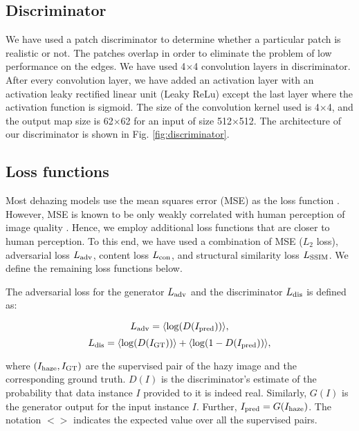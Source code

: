 \documentclass[runningheads]{llncs}
\begin{document}
\subsection{Discriminator} We have used a patch discriminator to determine whether a particular patch is realistic or not. The patches overlap in order to eliminate the problem of low performance on the edges. We have used 4$\times$4 convolution layers in discriminator. After every convolution layer, we have added an activation layer with an activation leaky rectified linear unit (Leaky ReLu) except the last layer where the activation function is sigmoid. The size of the convolution kernel used is 4$\times$4, and the output map size is 62$\times$62 for an input of size 512$\times$512. The architecture of our discriminator is shown in Fig. \ref{fig:discriminator}. 

\subsection{Loss functions}\label{sec:losses}
Most dehazing models use the mean squares error (MSE) as the loss function \cite{zhang2018multi}. However, MSE is known to be only weakly correlated with human perception of image quality \cite{huang2014visibility}. Hence, we employ additional loss functions that are closer to human perception. To this end, we have used a combination of MSE ($L_2$ loss), adversarial loss $L_{\rm{adv}}$, content loss $L_{\rm{con}}$, and structural similarity loss $L_{\rm{SSIM}}$. We define the remaining loss functions below. 

The adversarial loss for the generator $L_{\rm{adv}}$ and the discriminator $L_{\rm dis}$ is defined as:

\begin{equation}
    L_{\rm adv} = \langle \log(D(I_{\rm pred})) \rangle,
\end{equation}
\begin{equation}
    L_{\rm dis} = \langle \log(D(I_{\rm GT})) \rangle + \langle \log(1-D(I_{\rm pred})) \rangle,
\end{equation}

\noindent where $(I_{\rm haze}, I_{\rm GT})$ are the supervised pair of the hazy image and the corresponding ground truth. 
$D(I)$ is the discriminator’s estimate of the probability that data instance $I$ provided to it is indeed real. Similarly, $G(I)$ is the generator output for the input instance $I$. Further, $I_{\rm pred} = G (I_{\rm haze})$. The notation $<>$ indicates the expected value over all the supervised pairs. 
\end{document}

